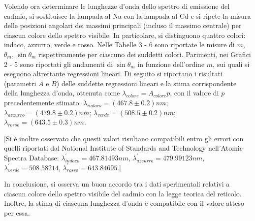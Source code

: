 \documentclass{article}
\begin{document}
Volendo ora determinare le lunghezze d'onda dello spettro di emissione del cadmio, si sostituisce la lampada al Na con la lampada al Cd e si ripete la misura delle posizioni angolari dei massimi principali (incluso il massimo centrale) per ciascun colore dello spettro visibile.
In particolare, si distinguono quattro colori: indaco, azzurro, verde e rosso. Nelle Tabelle 3 - 6 sono riportate le misure di $m$, $\theta_m$, $\sin \theta_m$ rispettivamente per ciascuno dei suddetti colori.
Parimenti, nei Grafici 2 - 5 sono riportati gli andamenti di $\sin \theta_m$ in funzione dell'ordine $m$, sui quali si eseguono altrettante regressioni lineari.
Di seguito si riportano i risultati (parametri $A$ e $B$) delle suddette regressioni lineari e la stima corrispondente della lunghezza d'onda, ottenuta come $\lambda_{colore}= A_{colore} p$, con il valore di $p$ precedentemente stimato:
$\lambda_{indaco} = (467.8 \pm 0.2)nm$;
$\lambda_{azzurro} = (479.8 \pm 0.2)nm$;
$\lambda_{verde} = (508.5 \pm 0.2)nm$;
$\lambda_{rosso} = (643.5 \pm 0.3)nm$.

[Si è inoltre osservato che questi valori risultano compatibili entro gli errori con quelli riportati dal National Institute of Standards and Technology nell'Atomic Spectra Database: $\lambda^'_{indaco} = 467.81493 nm$, $\lambda^'_{azzurro} = 479.99123 nm$, $\lambda^'_{verde} = 508.58214$, $\lambda^'_{rosso} = 643.84695$.]

In conclusione, si osserva un buon accordo tra i dati sperimentali relativi a ciascun colore dello spettro visibile del cadmio con la legge teorica del reticolo. Inoltre, la stima di ciascuna lunghezza d'onda è compatibile con il valore atteso per essa.



 
	
	
\end{document}
